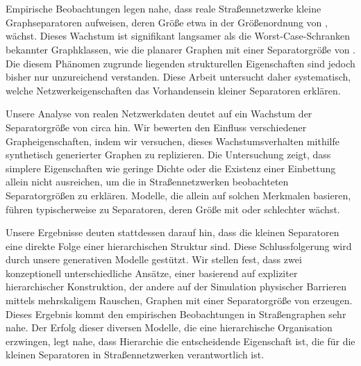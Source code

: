 \section*{\abstractname}

Empirische Beobachtungen legen nahe, dass reale Straßennetzwerke kleine Graphseparatoren aufweisen, deren Größe etwa in der Größenordnung von , wächst.
Dieses Wachstum ist signifikant langsamer als die Worst-Case-Schranken bekannter Graphklassen, wie die planarer Graphen mit einer Separatorgröße von .
Die diesem Phänomen zugrunde liegenden strukturellen Eigenschaften sind jedoch bisher nur unzureichend verstanden.
Diese Arbeit untersucht daher systematisch, welche Netzwerkeigenschaften das Vorhandensein kleiner Separatoren erklären.

Unsere Analyse von realen Netzwerkdaten deutet auf ein Wachstum der Separatorgröße von circa  hin.
Wir bewerten den Einfluss verschiedener Grapheigenschaften, indem wir versuchen, dieses Wachstumsverhalten mithilfe synthetisch generierter Graphen zu replizieren.
Die Untersuchung zeigt, dass simplere Eigenschaften wie geringe Dichte oder die Existenz einer Einbettung allein nicht ausreichen, um die in Straßennetzwerken beobachteten Separatorgrößen zu erklären.
Modelle, die allein auf solchen Merkmalen basieren, führen typischerweise zu Separatoren, deren Größe mit  oder schlechter wächst.

Unsere Ergebnisse deuten stattdessen darauf hin, dass die kleinen Separatoren eine direkte Folge einer hierarchischen Struktur sind.
Diese Schlussfolgerung wird durch unsere generativen Modelle gestützt.
Wir stellen fest, dass zwei konzeptionell unterschiedliche Ansätze, einer basierend auf expliziter hierarchischer Konstruktion, der andere auf der Simulation physischer Barrieren mittels mehrskaligem Rauschen, Graphen mit einer Separatorgröße von  erzeugen.
Dieses Ergebnis kommt den empirischen Beobachtungen in Straßengraphen sehr nahe.
Der Erfolg dieser diversen Modelle, die eine hierarchische Organisation erzwingen, legt nahe, dass Hierarchie die entscheidende Eigenschaft ist, die für die kleinen Separatoren in Straßennetzwerken verantwortlich ist.
